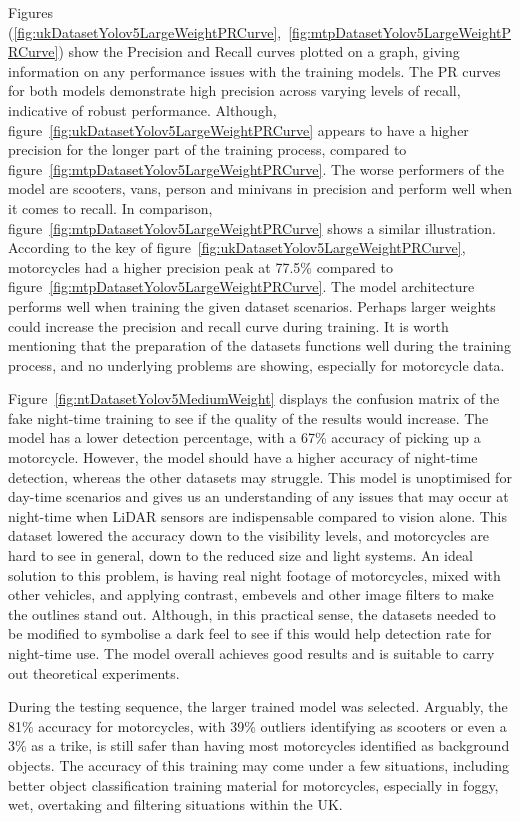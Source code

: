 \documentclass[12pt]{report} %
\begin{document}
		Figures (\ref{fig:ukDatasetYolov5LargeWeightPRCurve},~\ref{fig:mtpDatasetYolov5LargeWeightPRCurve}) show the Precision and Recall curves plotted on a graph, giving information on any performance issues with the training models. The PR curves for both models demonstrate high precision across varying levels of recall, indicative of robust performance. Although, figure~\ref{fig:ukDatasetYolov5LargeWeightPRCurve} appears to have a higher precision for the longer part of the training process, compared to figure~\ref{fig:mtpDatasetYolov5LargeWeightPRCurve}. The worse performers of the model are scooters, vans, person and minivans in precision and perform well when it comes to recall. In comparison, figure~\ref{fig:mtpDatasetYolov5LargeWeightPRCurve} shows a similar illustration. According to the key of figure~\ref{fig:ukDatasetYolov5LargeWeightPRCurve}, motorcycles had a higher precision peak at 77.5\% compared to figure~\ref{fig:mtpDatasetYolov5LargeWeightPRCurve}. The model architecture performs well when training the given dataset scenarios. Perhaps larger weights could increase the precision and recall curve during training. It is worth mentioning that the preparation of the datasets functions well during the training process, and no underlying problems are showing, especially for motorcycle data.

		Figure~\ref{fig:ntDatasetYolov5MediumWeight} displays the confusion matrix of the fake night-time training to see if the quality of the results would increase. The model has a lower detection percentage, with a 67\% accuracy of picking up a motorcycle. However, the model should have a higher accuracy of night-time detection, whereas the other datasets may struggle. This model is unoptimised for day-time scenarios and gives us an understanding of any issues that may occur at night-time when LiDAR sensors are indispensable compared to vision alone. This dataset lowered the accuracy down to the visibility levels, and motorcycles are hard to see in general, down to the reduced size and light systems. An ideal solution to this problem, is having real night footage of motorcycles, mixed with other vehicles, and applying contrast, embevels and other image filters to make the outlines stand out. Although, in this practical sense, the datasets needed to be modified to symbolise a dark feel to see if this would help detection rate for night-time use. The model overall achieves good results and is suitable to carry out theoretical experiments.

		During the testing sequence, the larger trained model was selected. Arguably, the 81\% accuracy for motorcycles, with 39\% outliers identifying as scooters or even a 3\% as a trike, is still safer than having most motorcycles identified as background objects. The accuracy of this training may come under a few situations, including better object classification training material for motorcycles, especially in foggy, wet, overtaking and filtering situations within the UK.
\end{document}
